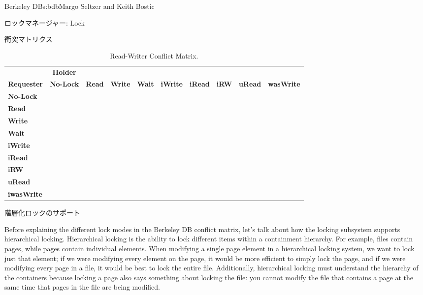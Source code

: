 \begin{aosachapter}{Berkeley DB}{s:bdb}{Margo Seltzer and Keith Bostic}
\begin{aosasect1}{ロックマネージャー: Lock}
\begin{aosasect2}{衝突マトリクス}
\begin{table}[h]\small\centering
\begin{tabular} { | l | c | c | c | c | c | c | c | c | c | }
\hline
& {\bf Holder} & & & & & & & & \\
{\bf Requester} & {\bf No-Lock}	& {\bf Read} & {\bf Write} & {\bf Wait}	& {\bf iWrite} & {\bf iRead} & {\bf iRW} & {\bf uRead} & {\bf wasWrite}\\
\hline
{\bf No-Lock}	&	&	& &	& & &	& & \\
\hline
{\bf Read}	& 		& 		& \checkmark & 		& \checkmark   & 	     & \checkmark & 	       & \checkmark\\
\hline
{\bf Write}	& 		& \checkmark	& \checkmark & \checkmark & \checkmark & \checkmark   & \checkmark & \checkmark	& \checkmark\\
\hline
{\bf Wait}	& 		& 		& 	   & 		& 	       & 	     & 	 	& 	       & \\
\hline
{\bf iWrite}	& 		& \checkmark	& \checkmark & 		& 	       & 	     & 	 	& \checkmark   & \checkmark\\
\hline
{\bf iRead}	& 		& 		& \checkmark & 		& 	       & 	     & 	 	& 	       & \checkmark\\
\hline
{\bf iRW}	& 		& \checkmark	& \checkmark & 		& 	       & 	     & 	 	& \checkmark   & \checkmark\\
\hline
{\bf uRead}	& 		& 		& \checkmark & 		& \checkmark   & 	     & \checkmark & 	       & \\
\hline
{\bf iwasWrite}	& 		& \checkmark	& \checkmark & 		& \checkmark   & \checkmark  & \checkmark & 	       & \checkmark\\
\hline
\end{tabular}
\caption{Read-Writer Conflict Matrix.}
\label{tbl.bdb.two}
\end{table}

\end{aosasect2}

\begin{aosasect2}{階層化ロックのサポート}

Before explaining the different lock modes in the Berkeley DB conflict
matrix, let's talk about how the locking subsystem supports
hierarchical locking. Hierarchical locking is the ability to lock
different items within a containment hierarchy. For example, files
contain pages, while pages contain individual elements. When modifying
a single page element in a hierarchical locking system, we want to
lock just that element; if we were modifying every element on the
page, it would be more efficient to simply lock the page, and if we
were modifying every page in a file, it would be best to lock the
entire file. Additionally, hierarchical locking must understand the
hierarchy of the containers because locking a page also says something
about locking the file: you cannot modify the file that contains a
page at the same time that pages in the file are being modified.


\end{aosasect2}
\end{aosasect1}
\end{aosachapter}

